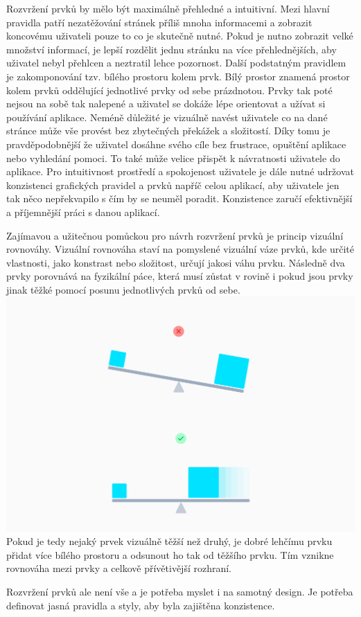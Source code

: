 		Rozvržení prvků by mělo být maximálně přehledné a intuitivní.
		Mezi hlavní pravidla patří nezatěžování stránek příliš mnoha informacemi a zobrazit koncovému uživateli pouze to
		co je skutečně nutné.
		Pokud je nutno zobrazit velké množství informací, je lepší rozdělit jednu stránku na více přehlednějších, aby
		uživatel nebyl přehlcen a neztratil lehce pozornost.
		Další podstatným pravidlem je zakomponování tzv. bílého prostoru kolem prvk.
		Bílý prostor znamená prostor kolem prvků oddělující jednotlivé prvky od sebe prázdnotou.
		Prvky tak poté nejsou na sobě tak nalepené a uživatel se dokáže lépe orientovat a užívat si používání aplikace.
		Neméně důležité je vizuálně navést uživatele co na dané stránce může vše provést bez zbytečných překážek a
		složitostí.
		Díky tomu je pravděpodobnější že uživatel dosáhne svého cíle bez frustrace, opuštění aplikace nebo vyhledání
		pomoci.
		To také může velice přispět k návratnosti uživatele do aplikace.
		Pro intuitivnost prostředí a spokojenost uživatele je dále nutné udržovat konzistenci grafických pravidel a prvků
		napříč celou aplikací, aby uživatele jen tak něco nepřekvapilo s čím by se neuměl poradit.
		Konzistence zaručí efektivnější a příjemnější práci s danou aplikací.
		\cite{create_great_ux}

		Zajímavou a užitečnou pomůckou pro návrh rozvržení prvků je princip vizuální rovnováhy.
		Vizuální rovnováha staví na pomyslené vizuální váze prvků, kde určité vlastnosti, jako konstrast nebo složitost,
		určují jakosi váhu prvku.
		Následně dva prvky porovnává na fyzikální páce, která musí zůstat v rovině i pokud jsou prvky jinak těžké pomocí
		posunu jednotlivých prvků od sebe.
		\includegraphics[width=0.24\linewidth]{obrazky/rovnovaha_paka.png}\hfill
		Pokud je tedy nejaký prvek vizuálně těžší než druhý, je dobré lehčímu prvku přidat více bílého prostoru a odsunout
		ho tak od těžšího prvku.
		Tím vznikne rovnováha mezi prvky a celkově přívětivější rozhraní.
		\cite{vizualni_rovnovaha}

		Rozvržení prvků ale není vše a je potřeba myslet i na samotný design.
		Je potřeba definovat jasná pravidla a styly, aby byla zajištěna konzistence.

